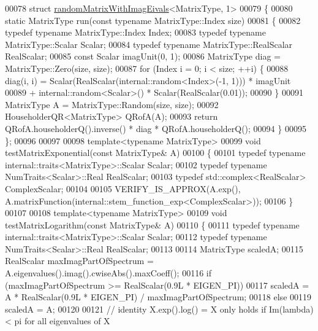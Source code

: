 \begin{DoxyCode}
00078 \textcolor{keyword}{struct }\hyperlink{structrandom_matrix_with_imag_eivals}{randomMatrixWithImagEivals}<MatrixType, 1>
00079 \{
00080   \textcolor{keyword}{static} MatrixType run(\textcolor{keyword}{const} \textcolor{keyword}{typename} MatrixType::Index size)
00081   \{
00082     \textcolor{keyword}{typedef} \textcolor{keyword}{typename} MatrixType::Index Index;
00083     \textcolor{keyword}{typedef} \textcolor{keyword}{typename} MatrixType::Scalar Scalar;
00084     \textcolor{keyword}{typedef} \textcolor{keyword}{typename} MatrixType::RealScalar RealScalar;
00085     \textcolor{keyword}{const} Scalar imagUnit(0, 1);
00086     MatrixType diag = MatrixType::Zero(size, size);
00087     \textcolor{keywordflow}{for} (Index i = 0; i < size; ++i) \{
00088       diag(i, i) = Scalar(RealScalar(internal::random<Index>(-1, 1))) * imagUnit
00089         + internal::random<Scalar>() * Scalar(RealScalar(0.01));
00090     \}
00091     MatrixType A = MatrixType::Random(size, size);
00092     HouseholderQR<MatrixType> QRofA(A);
00093     \textcolor{keywordflow}{return} QRofA.householderQ().inverse() * diag * QRofA.householderQ();
00094   \}
00095 \};
00096 
00097 
00098 \textcolor{keyword}{template}<\textcolor{keyword}{typename} MatrixType>
00099 \textcolor{keywordtype}{void} testMatrixExponential(\textcolor{keyword}{const} MatrixType& A)
00100 \{
00101   \textcolor{keyword}{typedef} \textcolor{keyword}{typename} internal::traits<MatrixType>::Scalar Scalar;
00102   \textcolor{keyword}{typedef} \textcolor{keyword}{typename} NumTraits<Scalar>::Real RealScalar;
00103   \textcolor{keyword}{typedef} std::complex<RealScalar> ComplexScalar;
00104 
00105   VERIFY\_IS\_APPROX(A.exp(), A.matrixFunction(internal::stem\_function\_exp<ComplexScalar>));
00106 \}
00107 
00108 \textcolor{keyword}{template}<\textcolor{keyword}{typename} MatrixType>
00109 \textcolor{keywordtype}{void} testMatrixLogarithm(\textcolor{keyword}{const} MatrixType& A)
00110 \{
00111   \textcolor{keyword}{typedef} \textcolor{keyword}{typename} internal::traits<MatrixType>::Scalar Scalar;
00112   \textcolor{keyword}{typedef} \textcolor{keyword}{typename} NumTraits<Scalar>::Real RealScalar;
00113 
00114   MatrixType scaledA;
00115   RealScalar maxImagPartOfSpectrum = A.eigenvalues().imag().cwiseAbs().maxCoeff();
00116   \textcolor{keywordflow}{if} (maxImagPartOfSpectrum >= RealScalar(0.9L * EIGEN\_PI))
00117     scaledA = A * RealScalar(0.9L * EIGEN\_PI) / maxImagPartOfSpectrum;
00118   \textcolor{keywordflow}{else}
00119     scaledA = A;
00120 
00121   \textcolor{comment}{// identity X.exp().log() = X only holds if Im(lambda) < pi for all eigenvalues of X}

\end{DoxyCode}
